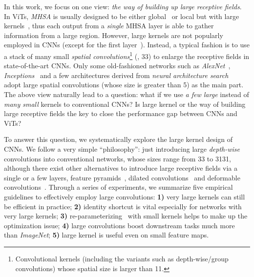 \documentclass[10pt,twocolumn,letterpaper]{article}
\begin{document}
	In this work, we focus on one view: \emph{the way of building up large receptive fields}. In ViTs, \emph{MHSA} is usually designed to be either global~\cite{vit,pvt,bot} or local but with large kernels~\cite{swin,halonet,sasa}, thus each output from a \emph{single} MHSA layer is able to gather information from a large region. However, large kernels are not popularly employed in CNNs (except for the first layer~\cite{he2016deep}). Instead, a typical fashion is to use a stack of many small \emph{spatial convolutions}\footnote{Convolutional kernels (including the variants such as depth-wise/group convolutions) whose spatial size is larger than 11.} \cite{simonyan2014very,he2016deep,zhang2018shufflenet,mbv1,huang2017densely,efficientnet,regnet} (\eg, 33) to enlarge the receptive fields in state-of-the-art CNNs. Only some old-fashioned networks such as \emph{AlexNet}~\cite{krizhevsky2012imagenet}, \emph{Inceptions}~\cite{szegedy2015going,szegedy2016rethinking,szegedy2017inception} and a few architectures derived from \emph{neural architecture search}~\cite{mbv3,liu2018darts,zoph2016neural,guo2020single} adopt large spatial convolutions (whose size is greater than 5) as the main part. 
	The above view naturally lead to a question: what if we use \emph{a few large} instead of \emph{many small} kernels to conventional CNNs? Is large kernel or the way of building large receptive fields the key to close the performance gap between CNNs and ViTs?
	
	
	To answer this question, we systematically explore the large kernel design of CNNs. We follow a very simple ``philosophy'': just introducing large \emph{depth-wise} convolutions into conventional networks, whose sizes range from 33 to 3131, although there exist other alternatives to introduce large receptive fields via a single or a few layers, \eg feature pyramids~\cite{wang2020deep}, dilated convolutions~\cite{yu2015multi,yu2017dilated,chen2017deeplab} and deformable convolutions~\cite{dai2017deformable}. Through a series of experiments, we summarize five empirical guidelines to effectively employ large convolutions: \textbf{1)} very large kernels can still be efficient in practice; \textbf{2)} identity shortcut is vital especially for networks with very large kernels; \textbf{3)} re-parameterizing~\cite{ding2021repvgg} with small kernels helps to make up the optimization issue; \textbf{4)} large convolutions boost downstream tasks much more than \emph{ImageNet}; \textbf{5)} large kernel is useful even on small feature maps.
	
\end{document}
